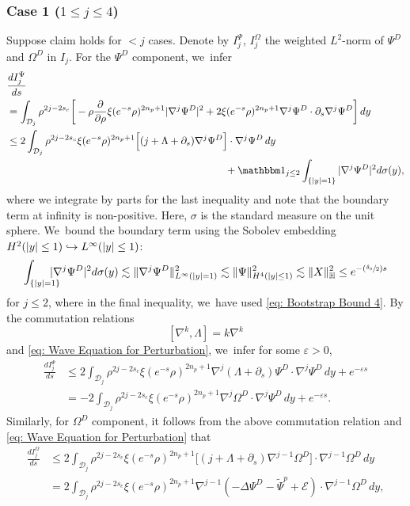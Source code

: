 \documentclass[JEP,XML,SOM,Unicode]{cedram}
\newcommand\hto{\mathrel{\lhook\joinrel\to}}
\newcommand{\Psfrac}[2]{(\sfrac{#1}{#2})}
\theoremstyle{plain}
\theoremstyle{definition}
\begin{document}
\subsubsection*{Case 1 ($1\le j\le 4$)}
Suppose claim holds for $< j$ cases. Denote by $I_j^\Psi$, $I_j^\Omega$ the weighted $L^2$-norm of $\Psi^D$ and $\Omega^D$ in $I_j$. For the $\Psi^D$ component, we~infer
\[
\begin{aligned}
&\frac{dI_j^\Psi}{ds}\\
&=\int_{\mathcal D_j}\rho^{2j-2s_c}\bigg[-\rho\frac{\partial}{\partial \rho}\xi(e^{-s}\rho)^{2n_p+1}|\nabla^j\Psi^D|^2+2\xi(e^{-s}\rho)^{2n_p+1}\nabla^j\Psi^D\cdot\partial_s\nabla^j\Psi^D\bigg]\,dy\\
&\le 2\int_{\mathcal D_j} \rho^{2j-2s_c}\xi(e^{-s}\rho)^{2n_p+1}\Big[(j+\Lambda+\partial_s)\nabla^j\Psi^D\Big]\cdot\nabla^j\Psi^D\,dy\\
&\hspace*{7.5cm}+\mathbbm 1_{j\le 2}\int_{\{|y|=1\}}|\nabla^j\Psi^D|^2d\sigma(y),
\end{aligned}
\]
where we integrate by parts for the last inequality and note that the boundary term at infinity is non-positive. Here, $\sigma$ is the standard measure on the unit sphere. We~bound the boundary term using the Sobolev embedding $H^2(|y|\le 1)\hto L^\infty(|y|\le 1)$:
\begin{equation}
\label{eq: Sobolev rho=1}
\int_{\{|y|=1\}}\hspace*{-4mm}|\nabla^j\Psi^D|^2d\sigma(y)\lesssim \Vert\nabla^j\Psi^D\Vert_{L^\infty(|y|=1)} ^2 \lesssim \Vert\Psi\Vert_{H^4(|y|\le 1)}^2\lesssim \Vert X\Vert_{\mathbb H}^2\le e^{-\Psfrac{\delta_0}{2}s}
\end{equation}
for $j\le 2$, where in the final inequality, we~have used \eqref{eq: Bootstrap Bound 4}. By the commutation relations
\[
[\nabla^k,\Lambda]=k\nabla^k
\]
and \eqref{eq: Wave Equation for Perturbation}, we~infer for some $\varepsilon>0$,
\[
\begin{aligned}
\frac{dI_j^\Psi}{ds} &\le 2\int_{\mathcal D_j}\rho^{2j-2s_c}\xi(e^{-s}\rho)^{2n_p+1}\nabla^j(\Lambda+\partial_s)\Psi^D\cdot\nabla^j\Psi^D\,dy+e^{-\varepsilon s}\\
&=-2\int_{\mathcal D_j} \rho^{2j-2s_c}\xi(e^{-s}\rho)^{2n_p+1}\nabla^j\Omega^D\cdot\nabla^j\Psi^D\,dy+e^{-\varepsilon s}.
\end{aligned}
\]
Similarly, for $\Omega^D$ component, it follows from the above commutation relation and \eqref{eq: Wave Equation for Perturbation} that
\begin{equation}
\label{eq: Omega Energy}
\begin{aligned}
\frac{dI_j^\Omega}{ds} &\le 2\int_{\mathcal D_j}\rho^{2j-2s_c}\xi(e^{-s}\rho)^{2n_p+1}\Big[(j+\Lambda+\partial_s)\nabla^{j-1}\Omega^D\Big]\cdot\nabla^{j-1}\Omega^D\,dy\\
&=2\int_{\mathcal D_j} \rho^{2j-2s_c}\xi(e^{-s}\rho)^{2n_p+1}\nabla^{j-1}(-\Delta \Psi^D -\tilde \Psi^p+\mathcal E)\cdot\nabla^{j-1}\Omega^D\,dy,
\end{aligned}
\end{equation}
\end{document}
